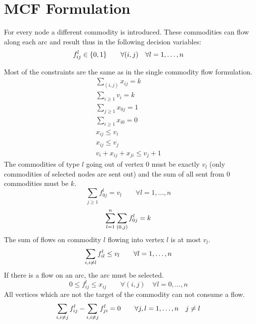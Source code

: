 \documentclass[a4paper]{article}
\numberwithin{equation}{section}
\begin{document}
\section{MCF Formulation}
For every node a different commodity is introduced. These commodities can flow along each 
arc and result thus in the following decision variables:
\begin{equation}
  f_{ij}^l \in \{0,1\} \qquad \forall (i,j) \quad \forall l = 1,\dots, n\\
\end{equation}

Most of the constraints are the same as in the single commodity flow formulation.
\begin{align}
	\sum_{(i,j)} x_{ij} = k\\
	\sum_{i\geq1}v_i =k \\
	\sum_{j\geq1} x_{0j}=1\\
	\sum_{i\geq1} x_{i0}=0\\
	x_{ij} \leq v_i\\
	x_{ij} \leq v_j\\
	v_i + x_{ij} + x_{ji} \leq v_j + 1
\end{align}
The commodities of type $l$ going out of vertex $0$ must be exactly $v_l$ (only commodities of selected nodes are sent out) 
and the sum of all sent from $0$ commodities must be $k$.
\begin{equation}
	\sum_{j\geq1} f_{0j}^l = v_l \qquad \forall l= 1,\dots, n
\end{equation}
\begin{equation}
	\sum_{l=1}^n \sum_{(0,j)} f_{0j}^l = k\\
\end{equation}
The sum of flows on commodity $l$ flowing into vertex $l$ is at most $v_l$.
\begin{equation}
\sum_{i,i\not =l} f_{il}^l \leq v_l \qquad \forall l = 1,\dots,n\\
\end{equation}
If there is a flow on an arc, the arc must be selected.
\begin{equation}
0\leq f_{ij}^l \leq x_{ij} \qquad \forall (i,j) \quad \forall l = 0,\ldots,n
\end{equation}
All vertices which are not the target of the commodity can not consume a flow.
\begin{equation}
\sum_{i,i\not = j}f_{ij}^l - \sum_{i,i\not = j} f_{ji}^l =0 \qquad \forall j, l = 1,\dots,n \quad j\not =l \\
\end{equation}
\end{document}
